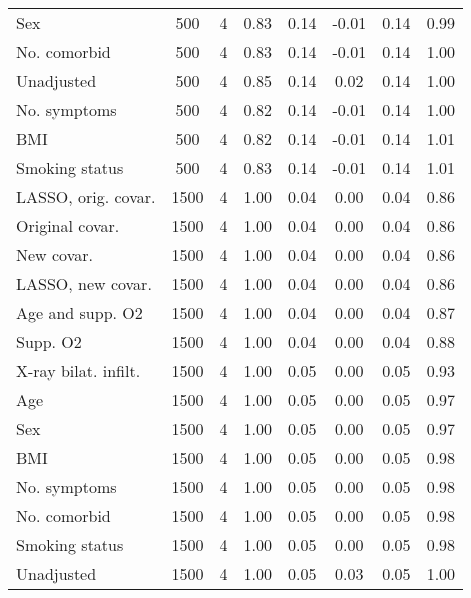 \documentclass{article}
\begin{document}
\begin{table}[htbp]
{\begin{tabular}{lccccccc}
Sex & 500 & 4 & 0.83 & 0.14 & -0.01 & 0.14 & 0.99\\
No. comorbid & 500 & 4 & 0.83 & 0.14 & -0.01 & 0.14 & 1.00\\
Unadjusted & 500 & 4 & 0.85 & 0.14 & 0.02 & 0.14 & 1.00\\
No. symptoms & 500 & 4 & 0.82 & 0.14 & -0.01 & 0.14 & 1.00\\
BMI & 500 & 4 & 0.82 & 0.14 & -0.01 & 0.14 & 1.01\\
Smoking status & 500 & 4 & 0.83 & 0.14 & -0.01 & 0.14 & 1.01\\ \midrule
LASSO, orig. covar. & 1500 & 4 & 1.00 & 0.04 & 0.00 & 0.04 & 0.86\\
Original covar. & 1500 & 4 & 1.00 & 0.04 & 0.00 & 0.04 & 0.86\\
New covar. & 1500 & 4 & 1.00 & 0.04 & 0.00 & 0.04 & 0.86\\
LASSO, new covar. & 1500 & 4 & 1.00 & 0.04 & 0.00 & 0.04 & 0.86\\
Age and supp. O2 & 1500 & 4 & 1.00 & 0.04 & 0.00 & 0.04 & 0.87\\
Supp. O2 & 1500 & 4 & 1.00 & 0.04 & 0.00 & 0.04 & 0.88\\
X-ray bilat. infilt. & 1500 & 4 & 1.00 & 0.05 & 0.00 & 0.05 & 0.93\\
Age & 1500 & 4 & 1.00 & 0.05 & 0.00 & 0.05 & 0.97\\
Sex & 1500 & 4 & 1.00 & 0.05 & 0.00 & 0.05 & 0.97\\
BMI & 1500 & 4 & 1.00 & 0.05 & 0.00 & 0.05 & 0.98\\
No. symptoms & 1500 & 4 & 1.00 & 0.05 & 0.00 & 0.05 & 0.98\\
No. comorbid & 1500 & 4 & 1.00 & 0.05 & 0.00 & 0.05 & 0.98\\
Smoking status & 1500 & 4 & 1.00 & 0.05 & 0.00 & 0.05 & 0.98\\
Unadjusted & 1500 & 4 & 1.00 & 0.05 & 0.03 & 0.05 & 1.00\\
\bottomrule
\hline
\end{tabular}}
\end{table}
\end{document}
